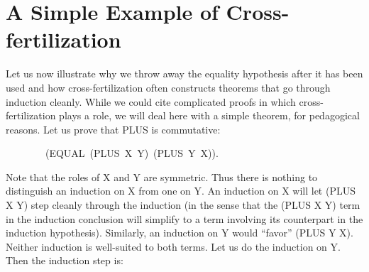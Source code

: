 \documentclass[10pt]{book}
\newenvironment{pubasis}{\begin{flushleft}}{\end{flushleft}}
\begin{document}
\section{A Simple Example of Cross-fertilization}
Let us now illustrate why we  throw away the equality
hypothesis after it has been used and how cross-fertilization
often constructs theorems that go through induction cleanly.
While we
could cite complicated proofs in which cross-fertilization plays a role,
we will deal here with a simple theorem, for pedagogical reasons.
Let us prove that PLUS is commutative:
\begin{pubasis}
~~~~~~~~(EQUAL~(PLUS~X~Y)~(PLUS~Y~X)).\\
\end{pubasis}
Note that the roles of X and Y are symmetric.  Thus there is nothing
to distinguish an induction on X from one on Y.  An induction on X will
let (PLUS X Y) step cleanly through the induction (in the sense that
the (PLUS X Y) term in the induction conclusion will simplify
to a term involving its counterpart in the induction hypothesis).
Similarly, an induction on Y would ``favor'' (PLUS Y X).  Neither
induction is well-suited to both terms.  Let us do the induction
on Y.  Then the induction step is:
\end{document}
